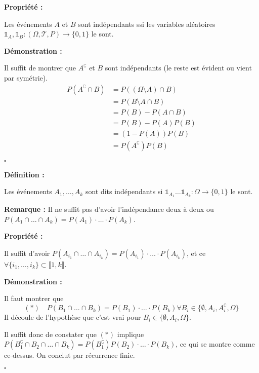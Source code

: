 \documentclass[10pt,a4paper,notitlepage ]{report}
\newcommand{\comp}[1]{#1^\complement}
\newenvironment{definition}{
	
	\textbf{Définition : }
}
{}
\newcounter{th}
\newenvironment{propriete}[1][]{
	\begin{tcolorbox}
		\textbf{Propriété #1 : }
}
{\end{tcolorbox}}
\newenvironment{demo}[1][]{

	\textbf{Démonstration #1 :}
}{\begin{flushright}
	$\square$
\end{flushright}
}
\newenvironment{rem}{
	
	\textbf{Remarque :}}{}
\begin{document}
\begin{propriete}
	Les événements $A$ et $B$ sont indépendants ssi les variables aléatoires $\mathds{1}_A, \mathds{1}_B : (\Omega, \mathcal T, P) \rightarrow \{0,1\}$ le sont.
\end{propriete}

\begin{demo}
	Il suffit de montrer que $\comp A$ et $B$ sont indépendants (le reste est évident ou vient par symétrie).
	\begin{align*}
		P(\comp A\cap B) &= P((\Omega \setminus A) \cap B) \\
		&= P(B \setminus A\cap B) \\
		&= P(B) - P(A\cap B) \\
		&= P(B) - P(A)P(B) \\
		&= (1-P(A))P(B) \\
		&= P(\comp A)P(B)
	\end{align*} 
\end{demo}

\begin{definition}
	Les événements $A_1,\dots,A_k$ sont dits indépendants si $\mathds 1_{A_1} \dots \mathds 1_{A_k} : \Omega \rightarrow \{0,1\}$ le sont.
\end{definition}

\begin{rem}
	Il ne suffit pas d'avoir l'indépendance deux à deux ou $P(A_1 \cap \dots \cap A_k) = P(A_1) \cdot \dots \cdot P(A_k)$.
\end{rem}

\begin{propriete}
	Il suffit d'avoir $P(A_{i_1} \cap \dots \cap A_{i_k}) = P(A_{i_1}) \cdot \dots \cdot P(A_{i_k})$, et ce $\forall \{i_1, \dots, i_k\} \subset \llbracket 1,k \rrbracket$.
\end{propriete}

\begin{demo}
	Il faut montrer que
	\[ (*) \quad P(B_1 \cap \dots \cap B_k) = P(B_1) \cdot \dots \cdot P(B_k) \forall B_i \in \{\emptyset, A_i, \comp{A_i}, \Omega\}	\]
	Il découle de l'hypothèse que c'est vrai pour $B_i \in \{ \emptyset, A_i, \Omega\}$.
	
	Il suffit donc de constater que $(*)$ implique $P (\comp{B_1} \cap B_2 \cap \dots \cap B_k) = P(\comp{B_1})P(B_2) \cdot \dots \cdot P(B_k)$, ce qui se montre comme ce-dessus. On conclut par récurrence finie.
\end{demo}
\end{document}
